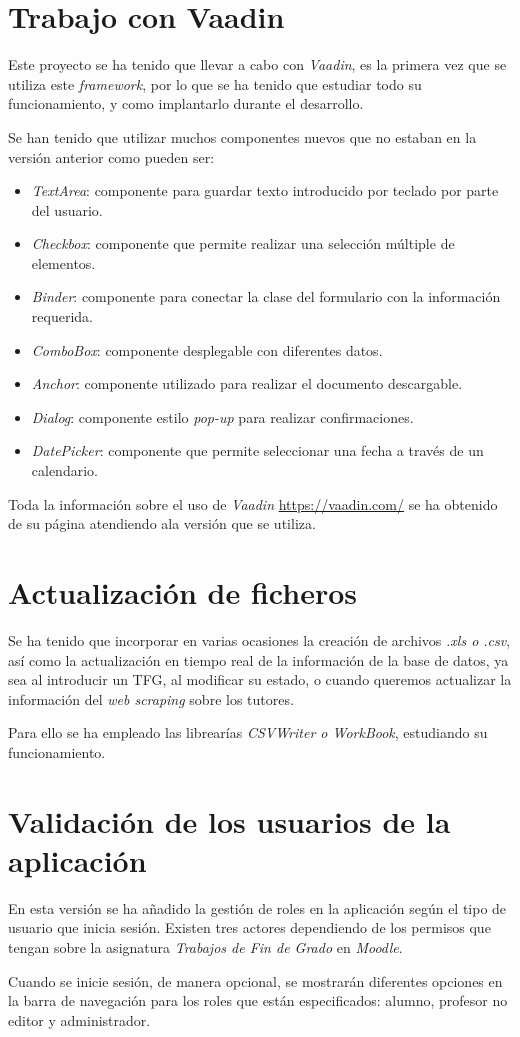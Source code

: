 \section{Trabajo con Vaadin}

Este proyecto se ha tenido que llevar a cabo con \emph{Vaadin}, es la primera vez que se utiliza este \emph{framework}, por lo que se ha tenido que estudiar todo su funcionamiento, y como implantarlo durante el desarrollo.

Se han tenido que utilizar muchos componentes nuevos que no estaban en la versión anterior como pueden ser:

\begin{itemize}
	\item \emph{TextArea}: componente para guardar texto introducido por teclado por parte del usuario.
	\item \emph{Checkbox}: componente que permite realizar una selección múltiple de elementos.
	\item \emph{Binder}: componente para conectar la clase del formulario con la información requerida.
	\item \emph{ComboBox}: componente desplegable con diferentes datos.
	\item \emph{Anchor}: componente utilizado para realizar el documento descargable.
	\item \emph{Dialog}: componente estilo \emph{pop-up} para realizar confirmaciones.
	\item \emph{DatePicker}: componente que permite seleccionar una fecha a través de un calendario.

\end{itemize}

Toda la información sobre el uso de \emph{Vaadin} \url{https://vaadin.com/} se ha obtenido de su página atendiendo ala versión que se utiliza.

\section{Actualización de ficheros}

Se ha tenido que incorporar en varias ocasiones la creación de archivos \emph{.xls o .csv}, así como la actualización en tiempo real de la información de la base de datos, ya sea al introducir un TFG, al modificar su estado, o cuando queremos actualizar la información del \emph{web scraping} sobre los tutores.

Para ello se ha empleado las librearías \emph{CSVWriter o WorkBook}, estudiando su funcionamiento.

\section{Validación de los usuarios de la aplicación}

En esta versión se ha añadido la gestión de roles en la aplicación según el tipo de usuario que inicia sesión. Existen tres actores dependiendo de los permisos que tengan sobre la asignatura \emph{Trabajos de Fin de Grado} en \emph{Moodle}.

Cuando se inicie sesión, de manera opcional, se mostrarán diferentes opciones en la barra de navegación para los roles que están especificados: alumno, profesor no editor y administrador.
